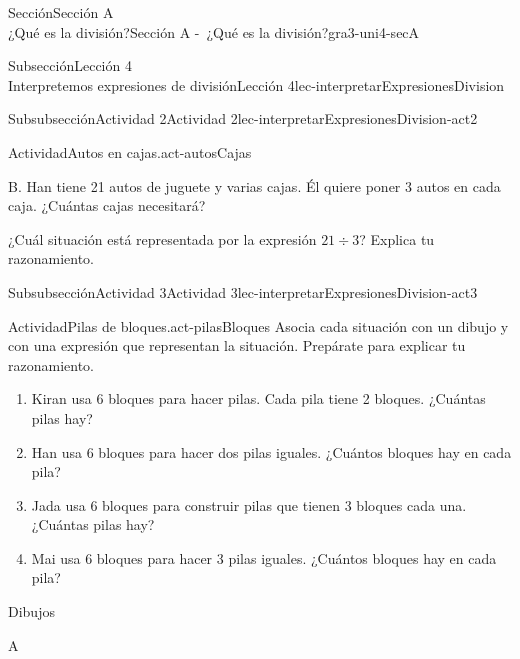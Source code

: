 \begin{sectionptx}{Sección}{{\Large Sección A\\}¿Qué es la división?}{}{Sección A -~¿Qué es la división?}{}{}{gra3-uni4-secA}
\begin{subsectionptx}{Subsección}{{\normalsize Lección 4\\[-0.05cm]}Interpretemos expresiones de división}{}{Lección 4}{}{}{lec-interpretarExpresionesDivision}
\begin{subsubsectionptx}{Subsubsección}{Actividad 2}{}{Actividad 2}{}{}{lec-interpretarExpresionesDivision-act2}
\begin{activity}{Actividad}{Autos en cajas.}{act-autosCajas}
\begin{sidebyside}{2}{0.05}{0.05}{0.1}
\begin{sbspanel}{0.4}
B. Han tiene 21 autos de juguete y varias cajas. Él quiere poner 3 autos en cada caja. ¿Cuántas cajas necesitará?%
\end{sbspanel}%
\end{sidebyside}%
\par
¿Cuál situación está representada por la expresión \(21\div 3\)? Explica tu razonamiento.%
\end{activity}%
\end{subsubsectionptx}
%
%
\typeout{************************************************}
\typeout{************************************************}
%
\clearpage
\begin{subsubsectionptx}{Subsubsección}{Actividad 3}{}{Actividad 3}{}{}{lec-interpretarExpresionesDivision-act3}
\begin{activity}{Actividad}{Pilas de bloques.}{act-pilasBloques}%
Asocia cada situación con un dibujo y con una expresión que representan la situación. Prepárate para explicar tu razonamiento.%
%
\begin{enumerate}
\item{}Kiran usa 6 bloques para hacer pilas. Cada pila tiene 2 bloques. ¿Cuántas pilas hay?%
\item{}Han usa 6 bloques para hacer dos pilas iguales. ¿Cuántos bloques hay en cada pila?%
\item{}Jada usa 6 bloques para construir pilas que tienen 3 bloques cada una. ¿Cuántas pilas hay?%
\item{}Mai usa 6 bloques para hacer 3 pilas iguales. ¿Cuántos bloques hay en cada pila?%
\end{enumerate}
Dibujos%
\begin{sidebyside}{2}{0.05}{0.05}{0.1}%
\begin{sbspanel}{0.4}%
A%
\par

\end{sbspanel}
\end{sidebyside}
\end{activity}
\end{subsubsectionptx}
\end{subsectionptx}
\end{sectionptx}

